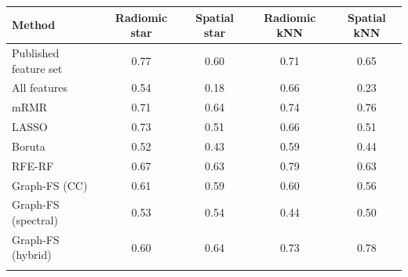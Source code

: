 \begin{tabular}{@{}lcccc@{}}
\toprule
Method & Radiomic star & Spatial star & Radiomic kNN & Spatial kNN \\
\midrule
Published feature set & 0.77 & 0.60 & 0.71 & 0.65 \\
All features & 0.54 & 0.18 & 0.66 & 0.23 \\
mRMR & 0.71 & 0.64 & 0.74 & 0.76 \\
LASSO & 0.73 & 0.51 & 0.66 & 0.51 \\
Boruta & 0.52 & 0.43 & 0.59 & 0.44 \\
RFE-RF & 0.67 & 0.63 & 0.79 & 0.63 \\
Graph-FS (CC) & 0.61 & 0.59 & 0.60 & 0.56 \\
Graph-FS (spectral) & 0.53 & 0.54 & 0.44 & 0.50 \\
Graph-FS (hybrid) & 0.60 & 0.64 & 0.73 & 0.78 \\
\botrule
\end{tabular}
